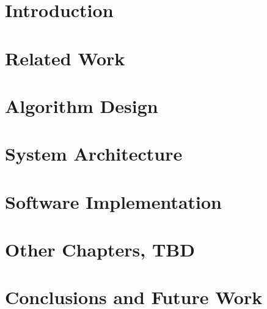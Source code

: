 \documentclass[11pt, oneside, a4paper, oldfontcommands]{memoir}
\begin{document}
\frontmatter


\mainmatter

\chapter{Introduction}

\chapter{Related Work}

\chapter{Algorithm Design}

\chapter{System Architecture}

\chapter{Software Implementation}

\chapter{Other Chapters, TBD}
\chapter{Conclusions and Future Work}
%
%
%
%

\clearpage




\appendix

%

\backmatter

\end{document}
